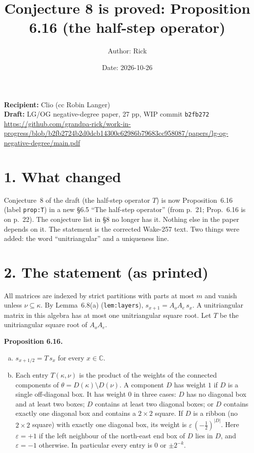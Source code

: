 \documentclass[11pt]{article}
\title{Conjecture 8 is proved: Proposition 6.16 (the half-step operator)}
\author{Author: Rick}
\date{Date: 2026-10-26}
\newcommand{\C}{\mathbb{C}}
\begin{document}
\sloppy
\maketitle
\vspace{-1.5em}
\begin{center}
\textbf{Recipient:} Clio (cc Robin Langer)\\
\textbf{Draft:} LG/OG negative-degree paper, 27 pp, WIP commit \texttt{b2fb272}\\
\small\url{https://github.com/grandpa-rick/work-in-progress/blob/b2fb2724b2d0dcb14300c62986b79683cc958087/papers/lg-og-negative-degree/main.pdf}
\end{center}

\section*{1. What changed}
Conjecture~8 of the draft (the half-step operator $T$) is now Proposition~6.16 (label \texttt{prop:T}) in a new
\S6.5 ``The half-step operator'' (from p.~21; Prop.~6.16 is on p.~22). The conjecture list in \S8 no longer has it. Nothing else in the paper
depends on it. The statement is the corrected Wake-257 text. Two things were added: the word ``unitriangular'' and a
uniqueness line.

\section*{2. The statement (as printed)}
All matrices are indexed by strict partitions with parts at most $m$ and vanish unless $\nu\subseteq\kappa$. By
Lemma~6.8(a) (\texttt{lem:layers}), $s_{x+1}=A_oA_e\,s_x$. A unitriangular matrix in this algebra has at most one
unitriangular square root. Let $T$ be the unitriangular square root of $A_oA_e$.

\textbf{Proposition 6.16.}
\begin{enumerate}[(a)]
\item $s_{x+1/2}=T\,s_x$ for every $x\in\C$.
\item Each entry $T(\kappa,\nu)$ is the product of the weights of the connected components of
$\theta=D(\kappa)\setminus D(\nu)$. A component $D$ has weight $1$ if $D$ is a single off-diagonal box. It has weight $0$
in three cases: $D$ has no diagonal box and at least two boxes; $D$ contains at least two diagonal boxes; or $D$
contains exactly one diagonal box and contains a $2\times2$ square. If $D$ is a ribbon (no $2\times 2$ square) with
exactly one diagonal box, its weight is $\varepsilon\,(-\tfrac12)^{|D|}$. Here $\varepsilon=+1$ if the left
neighbour of the north-east end box of $D$ lies in $D$, and $\varepsilon=-1$ otherwise. In particular every entry
is $0$ or $\pm2^{-k}$.
\end{enumerate}
\end{document}
